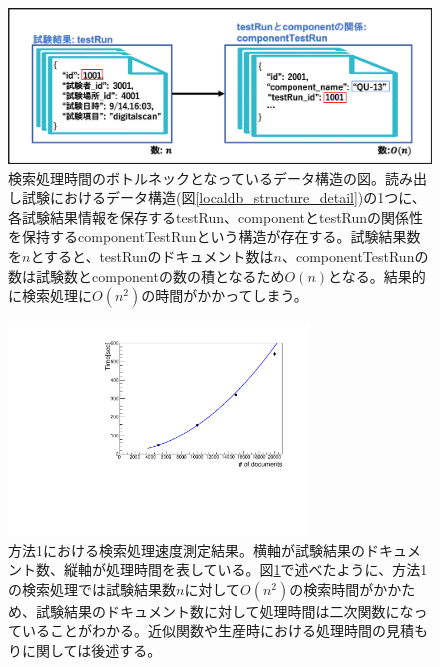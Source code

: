 \begin{figure}[bpt]
  \begin{center}
    \includegraphics[width=12cm]{./search_python_testRun.png}
  \caption[検索処理時間のボトルネックとなっているデータ構造]{検索処理時間のボトルネックとなっているデータ構造の図。読み出し試験におけるデータ構造(図\ref{localdb_structure_detail})の1つに、各試験結果情報を保存するtestRun、componentとtestRunの関係性を保持するcomponentTestRunという構造が存在する。試験結果数を$n$とすると、testRunのドキュメント数は$n$、componentTestRunの数は試験数とcomponentの数の積となるため$O(n)$となる。結果的に検索処理に$O(n^2)$の時間がかかってしまう。}
  \label{search_python_testRun}
  \end{center}
\end{figure}

\begin{figure}[bpt]
  \begin{center}
    \includegraphics[width=8cm,angle=270]{./result_python_list_search.pdf}
  \caption[方法1における検索処理速度測定結果]{方法1における検索処理速度測定結果。横軸が試験結果のドキュメント数、縦軸が処理時間を表している。図\ref{search_python_testRun}で述べたように、方法1の検索処理では試験結果数$n$に対して$O(n^2)$の検索時間がかかため、試験結果のドキュメント数に対して処理時間は二次関数になっていることがわかる。近似関数や生産時における処理時間の見積もりに関しては後述する。}
  \label{searching_time_python_list}
  \end{center}
\end{figure}

